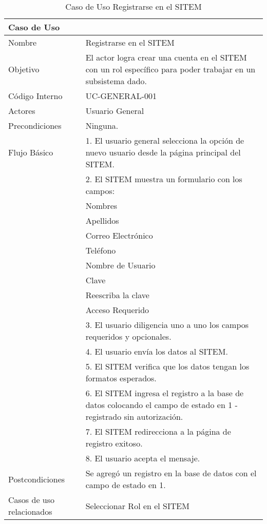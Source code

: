 \begin{table}
\begin{center}
\begin{tabular}{|l|p{10cm}|}
\hline
\textbf{Caso de Uso}&\\
\hline
Nombre & Registrarse en el SITEM\\
\hline
Objetivo & El actor logra crear una cuenta en el SITEM con un rol específico para poder trabajar en un subsistema dado.\\
\hline
Código Interno & UC-GENERAL-001 \\
\hline
Actores & Usuario General\\
\hline
Precondiciones & Ninguna.\\
\hline
Flujo Básico & 1. El usuario general selecciona la opción de nuevo usuario desde la página principal del SITEM.\\
& 2. El SITEM muestra un formulario con los campos:\\
& Nombres\\
& Apellidos\\
& Correo Electrónico\\
& Teléfono\\
& Nombre de Usuario\\
& Clave\\
& Reescriba la clave\\
& Acceso Requerido\\
& 3. El usuario diligencia uno a uno los campos requeridos y opcionales.\\
& 4. El usuario envía los datos al SITEM.\\
& 5. El SITEM verifica que los datos tengan los formatos esperados.\\
& 6. El SITEM ingresa el registro a la base de datos colocando el campo de estado en 1 - registrado sin autorización.\\
& 7. El SITEM redirecciona a la página de registro exitoso.\\
& 8. El usuario acepta el mensaje.\\
\hline
Postcondiciones & Se agregó un registro en la base de datos con el campo de estado en 1.\\
\hline
Casos de uso relacionados&Seleccionar Rol en el SITEM\\
\hline
\end{tabular}
\caption{Caso de Uso Registrarse en el SITEM}
\label{casouso1} 
\end{center}
\end{table}


